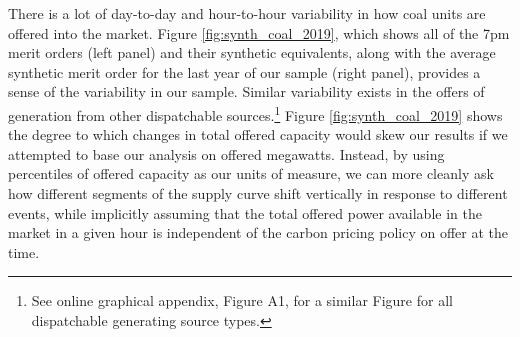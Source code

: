 \documentclass[12pt]{article}
\begin{document}
There is a lot of day-to-day and hour-to-hour variability in how coal units are offered into the market. Figure \ref{fig:synth_coal_2019}, which shows all of the 7pm merit orders (left panel) and their synthetic equivalents, along with the average synthetic merit order for the last year of our sample (right panel), provides a sense of the variability in our sample. Similar variability exists in the offers of generation from other dispatchable sources.\footnote{See online graphical appendix, Figure A1, for a similar Figure for all dispatchable generating source types.} Figure \ref{fig:synth_coal_2019} shows the degree to which changes in total offered capacity would skew our results if we attempted to base our analysis on offered megawatts. Instead, by using percentiles of offered capacity as our units of measure, we can more cleanly ask how different segments of the supply curve shift vertically in response to different events, while implicitly assuming that the total offered power available in the market in a given hour is independent of the carbon pricing policy on offer at the time.
\end{document}
